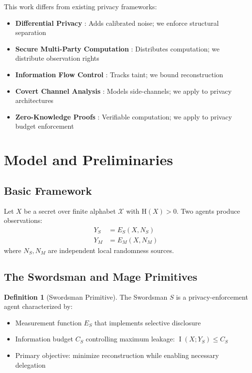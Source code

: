 \documentclass[11pt,a4paper]{article}
\theoremstyle{definition}
\newtheorem{definition}{Definition}[section]
\DeclareMathOperator{\I}{I}
\newcommand{\Entropy}{\mathrm{H}}
\begin{document}
This work differs from existing privacy frameworks:

\begin{itemize}
    \item \textbf{Differential Privacy} \cite{dwork2014}: Adds calibrated noise; we enforce structural separation
    \item \textbf{Secure Multi-Party Computation} \cite{goldreich2004}: Distributes computation; we distribute observation rights
    \item \textbf{Information Flow Control} \cite{sabelfeld2003}: Tracks taint; we bound reconstruction
    \item \textbf{Covert Channel Analysis} \cite{millen1987}: Models side-channels; we apply to privacy architectures
    \item \textbf{Zero-Knowledge Proofs} \cite{groth2016,gabizon2019}: Verifiable computation; we apply to privacy budget enforcement
\end{itemize}

\section{Model and Preliminaries}

\subsection{Basic Framework}

Let $X$ be a secret over finite alphabet $\mathcal{X}$ with $\Entropy(X) > 0$. Two agents produce observations:
\begin{align}
Y_S &= E_S(X, N_S) \\
Y_M &= E_M(X, N_M)
\end{align}
where $N_S, N_M$ are independent local randomness sources.

\subsection{The Swordsman and Mage Primitives}

\begin{definition}[Swordsman Primitive]
The Swordsman $S$ is a privacy-enforcement agent characterized by:
\begin{itemize}
    \item Measurement function $E_S$ that implements selective disclosure
    \item Information budget $C_S$ controlling maximum leakage: $\I(X; Y_S) \leq C_S$
    \item Primary objective: minimize reconstruction while enabling necessary delegation
\end{itemize}
\end{definition}
\end{document}
